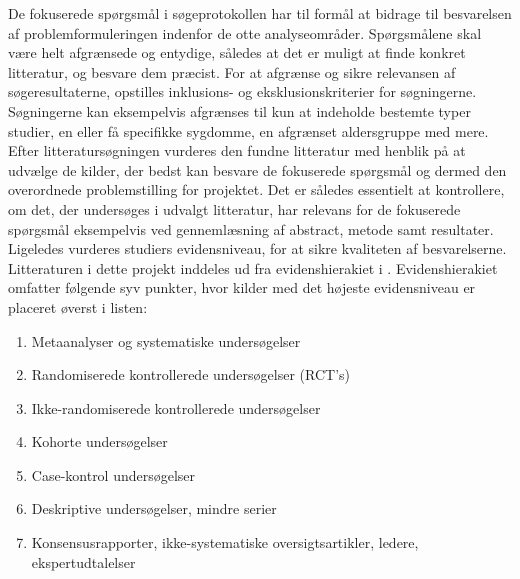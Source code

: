 De fokuserede spørgsmål i søgeprotokollen har til formål at bidrage til besvarelsen af problemformuleringen indenfor de otte analyseområder. Spørgsmålene skal være helt afgrænsede og entydige, således at det er muligt at finde konkret litteratur, og besvare dem præcist. \citep{metodehaandbogen}  
For at afgrænse og sikre relevansen af søgeresultaterne, opstilles inklusions- og eksklusionskriterier for søgningerne. Søgningerne kan eksempelvis afgrænses til kun at indeholde bestemte typer studier, en eller få specifikke sygdomme, en afgrænset aldersgruppe med mere. \citep{metodehaandbogen} \\
Efter litteratursøgningen vurderes den fundne litteratur med henblik på at udvælge de kilder, der bedst kan besvare de fokuserede spørgsmål og dermed den overordnede problemstilling for projektet. Det er således essentielt at kontrollere, om det, der undersøges i udvalgt litteratur, har relevans for de fokuserede spørgsmål eksempelvis ved gennemlæsning af abstract, metode samt resultater. Ligeledes vurderes studiers evidensniveau, for at sikre kvaliteten af besvarelserne. \citep{metodehaandbogen} 
Litteraturen i dette projekt inddeles ud fra evidenshierakiet i \cite{metodehaandbogen}. Evidenshierakiet omfatter følgende syv punkter, hvor kilder med det højeste evidensniveau er placeret øverst i listen:

\begin{enumerate}
\item Metaanalyser og systematiske undersøgelser 
\item Randomiserede kontrollerede undersøgelser (RCT’s)
\item Ikke-randomiserede kontrollerede undersøgelser
\item Kohorte undersøgelser
\item Case-kontrol undersøgelser
\item Deskriptive undersøgelser, mindre serier
\item Konsensusrapporter, ikke-systematiske oversigtsartikler, ledere, ekspertudtalelser
\end{enumerate}

